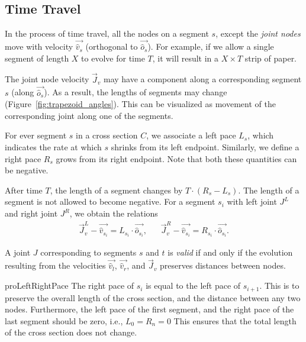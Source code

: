 \subsection{Time Travel}
\label{sec:time_travel}

In the process of time travel, all the nodes on a segment $s$, except the
\emph{joint nodes} move with velocity $\vec{\hat v_s}$ (orthogonal to $\vec{\hat
o_s}$). For example, if we allow a single segment of length $X$ to evolve for
time $T$, it will result in a $X\times T$ strip of paper.

The joint node velocity $\vec J_v$ may have a component along a corresponding
segment $s$ (along $\vec{\hat o_s}$). As a result, the lengths of segments may
change (Figure~\ref{fig:trapezoid_angles}). This can be visualized as movement
of the corresponding joint along one of the segments.

\begin{definition}
\label{def:segment_length}
For ever segment $s$ in a cross section $C$, we associate a left pace $L_s$,
which indicates the rate at which $s$ shrinks from its left endpoint.
Similarly, we define a right pace $R_s$ grows from its right endpoint.
Note that both these quantities can be negative.
\end{definition}
After time $T$, the length of a segment changes by $T\cdot(R_s-L_s)$.
The length of a segment is not allowed to become negative.
For a segment $s_i$ with left joint $J^L$ and right joint $J^R$, we obtain the relations
\begin{align*}
\vec J_v^L-\vec{\hat v_{s_i}} = L_{s_i}\cdot \vec{\hat o_{s_i}}, && \vec J_v^R-\vec{\hat v_{s_i}} = R_{s_i}\cdot \vec{\hat o_{s_i}}.
\end{align*}

\begin{proposition}
\label{prop:valid_joint}
A joint $J$ corresponding to segments $s$ and $t$ is \emph{valid} if and only if the evolution
resulting from the velocities $\vec{\hat v_l}$, $\vec{\hat v_r}$, and $\vec J_v$ preserves distances between nodes.
\end{proposition}
\vspace{-1pc}
\begin{restatable}{pro}{LeftRightPace}
\label{pro:left_right_pace}
The right pace of $s_{i}$ is equal to the left pace of $s_{i+1}$.
This is to preserve the overall length of the cross section, and the distance between any two nodes.
Furthermore, the left pace of the first segment, and the right pace of the last segment should be zero, i.e., $L_0 = R_n = 0$
This ensures that the total length of the cross section does not change.
\end{restatable}

